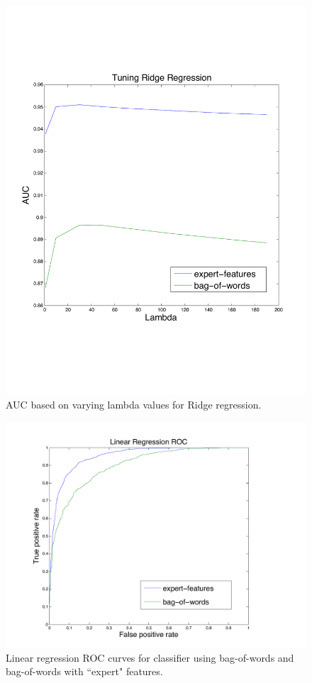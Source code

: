 \documentclass[preprint]{acm_proc_article-sp}
\begin{document}
\begin{figure}[h]
    \centering
    \includegraphics[width=\linewidth]{figures/linear-ridge.pdf}
    \caption{AUC based on varying lambda values for Ridge regression.}
    \label{fig:lambda}
\end{figure}


\begin{figure}[h]
    \centering
    \includegraphics[width=\linewidth]{figures/linear-roc.pdf}
    \caption{Linear regression ROC curves for classifier using bag-of-words and bag-of-words with ``expert" features.}
    \label{fig:roclin}
\end{figure}
\end{document}
